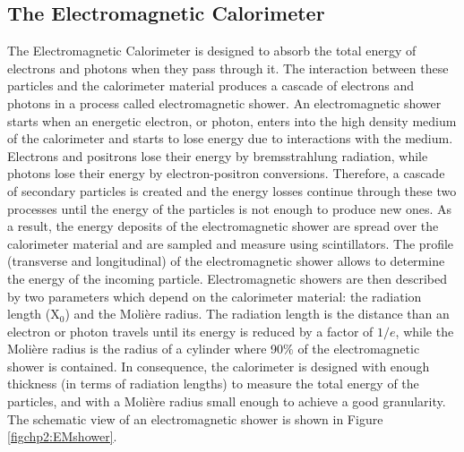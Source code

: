 

\subsection{The Electromagnetic Calorimeter}
\label{subsec:ECal}

\noindent The Electromagnetic Calorimeter is designed to absorb the total energy 
of electrons and photons when they pass through it. The interaction between these 
particles and the calorimeter material produces a cascade of electrons and photons in a process 
called electromagnetic shower. An electromagnetic shower starts when an energetic electron, 
or photon, enters into the high density medium of the calorimeter and starts to lose energy
due to interactions with the medium. Electrons and 
positrons lose their energy by bremsstrahlung radiation, while photons 
lose their energy by electron-positron conversions. Therefore, a cascade
of secondary particles is created and the energy losses continue through 
these two processes until the energy of the particles is not
enough to produce new ones. As a result, the energy deposits of the electromagnetic shower 
are spread over the calorimeter material and are sampled and measure using scintillators. The
 profile (transverse and longitudinal) of the electromagnetic shower allows to 
determine the energy of the incoming particle. Electromagnetic showers 
are then described by two parameters which depend on the calorimeter 
material: the radiation length (X$_{0}$) and the Moli\`ere radius. The radiation length is 
the distance than an electron or photon travels until its energy is reduced by a factor 
of $1/e$, while the Moli\`ere radius is the radius of a cylinder where 90$\%$ of 
the electromagnetic shower is contained. In consequence, the calorimeter 
is designed with enough thickness (in terms of radiation lengths) to measure the total
energy of the particles, and with a Moli\`ere radius small enough to achieve a good granularity. 
The schematic view of an electromagnetic shower is shown in Figure \ref{figchp2:EMshower}. 



